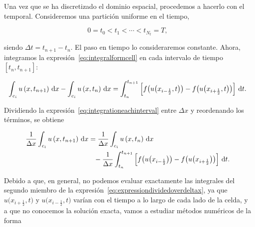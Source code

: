 Una vez que se ha discretizado el dominio espacial, procedemos a
hacerlo con el temporal.
Consideremos una partición uniforme en el tiempo,

\begin{equation*}
  0=
  t_{0}<
  t_{1}<
  \cdots<
  t_{N_{t}}=
  T,
\end{equation*}

siendo $\Delta t=t_{n+1}-t_{n}$.
El paso en tiempo lo consideraremos constante.
Ahora, integramos la expresión~\eqref{eq:integralformcell} en cada
intervalo de tiempo $\left[t_{n},t_{n+1}\right]$:

\begin{equation}\label{eq:integrationeachinterval}
  \int_{c_{i}}
  u
  \left(x,t_{n+1}\right)
  \dl x-
  \int_{c_{i}}
  u
  \left(x,t_{n}\right)
  \dl x=
  \int_{t_{n}}^{t_{n+1}}
  \left[
    f
    \big(
    u\big(x_{i-\frac{1}{2}},t\big)
    \big)-
    f
    \big(
    u\big(x_{i+\frac{1}{2}},t\big)
    \big)
    \right]
  \dl t.
\end{equation}

Dividiendo la expresión~\eqref{eq:integrationeachinterval} entre
$\Delta x$ y reordenando los términos, se obtiene

\begin{gather}\label{eq:expressiondividedoverdeltax}
  \begin{split}
    \frac{1}{\Delta x}
    \int_{c_{i}}
    u
    \left(x,t_{n+1}\right)
    \dl x
     & =
    \frac{1}{\Delta x}
    \int_{c_{i}}
    u
    \left(x,t_{n}\right)
    \dl x          \\
     & \phantom{=}
    -\frac{1}{\Delta x}
    \int_{t_{n}}^{t_{n+1}}
    \left[
      f
      \big(
      u\big(x_{i-\frac{1}{2}}\big)
      \big)-
      f
      \big(
      u\big(x_{i+\frac{1}{2}}\big)
      \big)
      \right]
    \dl t.
  \end{split}
\end{gather}

Debido a que, en general, no podemos evaluar exactamente las
integrales del segundo miembro de la
expresión~\eqref{eq:expressiondividedoverdeltax}, ya que
\begin{math}
  u
  \big(x_{i+\frac{1}{2}},t\big)
\end{math}
y
\begin{math}
  u
  \big(x_{i-\frac{1}{2}},t\big)
\end{math}
varían con el
tiempo a lo largo de cada lado de la celda, y a que no conocemos la
solución exacta, vamos a estudiar métodos numéricos de la forma

